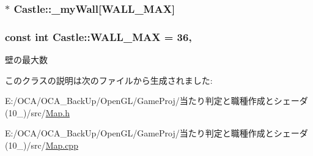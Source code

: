 \hypertarget{class_castle_a107cc14f37b6d1fc6c54c03540afaf2e}{
\subsubsection[{\-\_\-my\-Wall}]{$\ast$ Castle\-::\-\_\-my\-Wall\mbox{[}{\bf W\-A\-L\-L\-\_\-\-M\-A\-X}\mbox{]}\hspace{0.3cm}{\ttfamily [protected]}}}\label{class_castle_a107cc14f37b6d1fc6c54c03540afaf2e}
\hypertarget{class_castle_a3773249e9255e1a07d1e510866f88200}{
\subsubsection[{W\-A\-L\-L\-\_\-\-M\-A\-X}]{\setlength{\rightskip}{0pt plus 5cm}const int Castle\-::\-W\-A\-L\-L\-\_\-\-M\-A\-X = 36\hspace{0.3cm}{\ttfamily [static]}, {\ttfamily [protected]}}}\label{class_castle_a3773249e9255e1a07d1e510866f88200}


壁の最大数 



このクラスの説明は次のファイルから生成されました\-:\begin{DoxyCompactItemize}
\item 
E\-:/\-O\-C\-A/\-O\-C\-A\-\_\-\-Back\-Up/\-Open\-G\-L/\-Game\-Proj/当たり判定と職種作成とシェーダ(10\-\_)/src/\hyperlink{_map_8h}{Map.\-h}\item 
E\-:/\-O\-C\-A/\-O\-C\-A\-\_\-\-Back\-Up/\-Open\-G\-L/\-Game\-Proj/当たり判定と職種作成とシェーダ(10\-\_)/src/\hyperlink{_map_8cpp}{Map.\-cpp}\end{DoxyCompactItemize}
